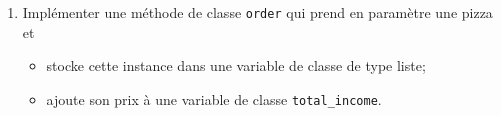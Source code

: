 \documentclass[a4paper,10pt,cours,firamath]{nsi}
\begin{document}
\begin{exercice}
\begin{enumerate}
\begin{center}
\begin{tabular}{|c|>{\centering\arraybackslash}m{1.3cm}|}
                      
                      \hline
                  \end{tabular}
              \end{center}
        \item     Implémenter une méthode de classe \texttt{order} qui prend en paramètre une pizza et
              \begin{itemize}
                  \item     stocke cette instance dans une variable de classe de type liste;
                  \item     ajoute son prix à une variable de classe \texttt{total_income}.
              \end{itemize}
    \end{enumerate}
\end{exercice}
\end{document}
